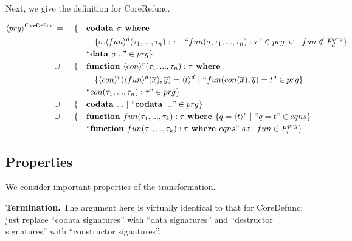 Next, we give the definition for \textsf{CoreRefunc}.

\begin{algorithm}

\begin{align*}
\langle prg \rangle^{\textsf{CoreDefunc}} & = ~&& \{ && \textrm{\textbf{codata }} \sigma \textrm{\textbf{ where }} \span\span\span\span \\
& && && && \{ \sigma.\langle fun \rangle^d (\tau_1, ..., \tau_n): \tau ~ | ~ `` fun(\sigma, \tau_1, ..., \tau_n): \tau " \in prg \text{ s.t. } fun \not\in F^{prg}_d \} \\
& && | && `` \textrm{\textbf{data }} \sigma ... " \in prg \} \span\span\span\span \\
& \cup && \{ && \textrm{\textbf{function }} \langle con \rangle^r (\tau_1, ..., \tau_n): \tau \textrm{\textbf{ where}} \span\span\span\span \\
& && && && \{ \langle con \rangle^r (\langle fun \rangle^d (\overline{x}), \overline{y}) = \langle t \rangle^d ~ | ~ `` fun(con(\overline{x}), \overline{y}) = t " \in prg \} \\
& && | && `` con(\tau_1, ..., \tau_n): \tau " \in prg \} \span\span\span\span \\
& \cup && \{ && \textrm{\textbf{codata }} ... ~ | ~ `` \textrm{\textbf{codata }} ... " \in prg \} \span\span\span\span \\
& \cup && \{ && \textrm{\textbf{function }} fun(\tau_1, ..., \tau_k): \tau \textrm{\textbf{ where }} \{ q = \langle t \rangle^r ~ | ~ "q = t" \in eqns \} \span\span\span\span \\
& && | && `` \textrm{\textbf{function }} fun(\tau_1, ..., \tau_k): \tau \textrm{\textbf{ where }} eqns " \text{ s.t. } fun \in F^{prg}_r \} \span\span\span\span
\end{align*}

\end{algorithm}

\subsection{Properties}

We consider important properties of the transformation.

\textbf{Termination.} The argument here is virtually identical to that for \textsf{CoreDefunc}; just replace ``codata signatures'' with ``data signatures'' and ``destructor signatures'' with ``constructor signatures''.

